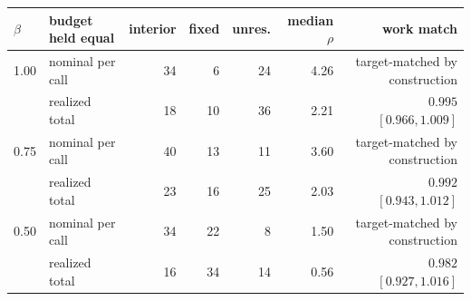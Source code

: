 \begin{tabular}{@{}l l r r r r r@{}}
\toprule
$\beta$ & budget held equal & interior & fixed & unres. & median $\rho$ & work match \\
\midrule
1.00 & nominal per call & 34 & 6 & 24 & 4.26 & target-matched by construction \\
 & realized total & 18 & 10 & 36 & 2.21 & $0.995$ $[0.966,1.009]$ \\
0.75 & nominal per call & 40 & 13 & 11 & 3.60 & target-matched by construction \\
 & realized total & 23 & 16 & 25 & 2.03 & $0.992$ $[0.943,1.012]$ \\
0.50 & nominal per call & 34 & 22 & 8 & 1.50 & target-matched by construction \\
 & realized total & 16 & 34 & 14 & 0.56 & $0.982$ $[0.927,1.016]$ \\
\bottomrule
\end{tabular}
